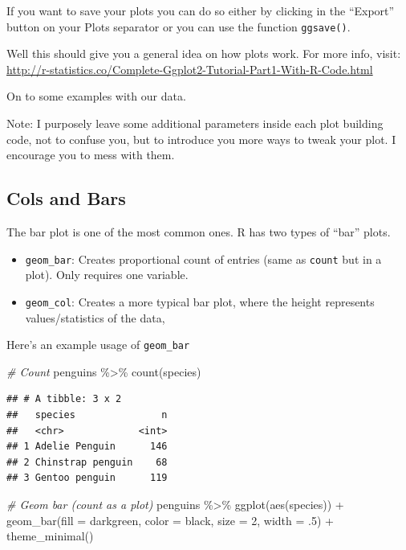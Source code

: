 \documentclass[
]{book}
\newenvironment{Shaded}{\begin{snugshade}}{\end{snugshade}}
\newcommand{\AttributeTok}[1]{\textcolor[rgb]{0.77,0.63,0.00}{#1}}
\newcommand{\CommentTok}[1]{\textcolor[rgb]{0.56,0.35,0.01}{\textit{#1}}}
\newcommand{\DecValTok}[1]{\textcolor[rgb]{0.00,0.00,0.81}{#1}}
\newcommand{\FunctionTok}[1]{\textcolor[rgb]{0.00,0.00,0.00}{#1}}
\newcommand{\NormalTok}[1]{#1}
\newcommand{\SpecialCharTok}[1]{\textcolor[rgb]{0.00,0.00,0.00}{#1}}
\newcommand{\StringTok}[1]{\textcolor[rgb]{0.31,0.60,0.02}{#1}}
\begin{document}
If you want to save your plots you can do so either by clicking in the ``Export'' button on your Plots separator or you can use the function \texttt{ggsave()}.

Well this should give you a general idea on how plots work.
For more info, visit: \url{http://r-statistics.co/Complete-Ggplot2-Tutorial-Part1-With-R-Code.html}

On to some examples with our data.

Note: I purposely leave some additional parameters inside each plot building code, not to confuse you, but to introduce you more ways to tweak your plot.
I encourage you to mess with them.

\hypertarget{cols-and-bars}{%
\subsection{Cols and Bars}\label{cols-and-bars}}

The bar plot is one of the most common ones.
R has two types of ``bar'' plots.

\begin{itemize}
\item
  \texttt{geom\_bar}: Creates proportional count of entries (same as \texttt{count} but in a plot).
  Only requires one variable.
\item
  \texttt{geom\_col}: Creates a more typical bar plot, where the height represents values/statistics of the data,
\end{itemize}

Here's an example usage of \texttt{geom\_bar}

\begin{Shaded}
\begin{Highlighting}[]
\CommentTok{\# Count}
\NormalTok{penguins }\SpecialCharTok{\%\textgreater{}\%} 
  \FunctionTok{count}\NormalTok{(species)}
\end{Highlighting}
\end{Shaded}

\begin{verbatim}
## # A tibble: 3 x 2
##   species               n
##   <chr>             <int>
## 1 Adelie Penguin      146
## 2 Chinstrap penguin    68
## 3 Gentoo penguin      119
\end{verbatim}

\begin{Shaded}
\begin{Highlighting}[]
\CommentTok{\# Geom bar (count as a plot)}
\NormalTok{penguins }\SpecialCharTok{\%\textgreater{}\%} 
  \FunctionTok{ggplot}\NormalTok{(}\FunctionTok{aes}\NormalTok{(species)) }\SpecialCharTok{+}
  \FunctionTok{geom\_bar}\NormalTok{(}\AttributeTok{fill =} \StringTok{\textquotesingle{}darkgreen\textquotesingle{}}\NormalTok{, }\AttributeTok{color =} \StringTok{\textquotesingle{}black\textquotesingle{}}\NormalTok{, }\AttributeTok{size =} \DecValTok{2}\NormalTok{, }\AttributeTok{width =}\NormalTok{ .}\DecValTok{5}\NormalTok{) }\SpecialCharTok{+}
  \FunctionTok{theme\_minimal}\NormalTok{()}
\end{Highlighting}
\end{Shaded}
\end{document}

